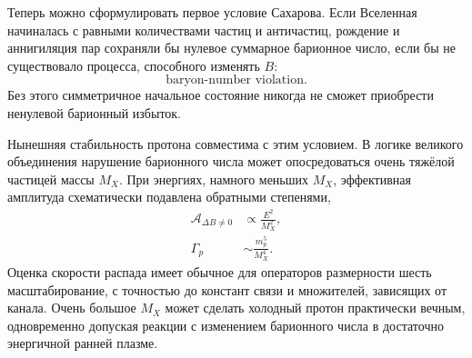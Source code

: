 \begin{classroomqa}
\end{classroomqa}

Теперь можно сформулировать первое условие Сахарова. Если Вселенная начиналась с равными количествами частиц и античастиц, рождение и аннигиляция пар сохраняли бы нулевое суммарное барионное число, если бы не существовало процесса, способного изменять \(B\):
\begin{equation}
\boxed{\text{baryon-number violation}.}
\end{equation}
Без этого симметричное начальное состояние никогда не сможет приобрести ненулевой барионный избыток.

Нынешняя стабильность протона совместима с этим условием. В логике великого объединения нарушение барионного числа может опосредоваться очень тяжёлой частицей массы \(M_X\). При энергиях, намного меньших \(M_X\), эффективная амплитуда схематически подавлена обратными степенями,
\begin{equation}
\begin{aligned}
\mathcal A_{\Delta B\ne0}&\propto \frac{E^2}{M_X^2},\\
\Gamma_p&\sim \frac{m_p^5}{M_X^4}.
\end{aligned}
\label{eq:c08-heavy-suppression}
\end{equation}
Оценка скорости распада имеет обычное для операторов размерности шесть масштабирование, с точностью до констант связи и множителей, зависящих от канала. Очень большое \(M_X\) может сделать холодный протон практически вечным, одновременно допуская реакции с изменением барионного числа в достаточно энергичной ранней плазме.

\begin{classroomqa}
\end{classroomqa}

